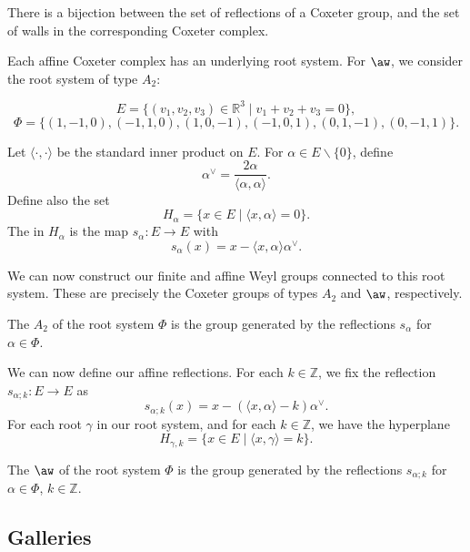 \documentclass[11pt]{article}
\begin{document}
\begin{proposition}\textnormal{\cite[Proposition 2.6]{RON}}
    There is a bijection between the set of reflections of a Coxeter group, and the set of walls in the corresponding Coxeter complex.
\end{proposition}

Each affine Coxeter complex has an underlying root system. For $\aw$, we consider the root system of type $A_2$:

\[E=\{(v_1,v_2,v_3)\in\mathbb{R}^3\mid v_1+v_2+v_3=0\},\]
\[\Phi = \{(1,-1,0),(-1,1,0),(1,0,-1),(-1,0,1),(0,1,-1),(0,-1,1)\}.\]


\begin{definition}
    Let $\langle\cdot,\cdot\rangle$ be the standard inner product on $E$. 
    For $\alpha\in E\backslash\{0\}$, define
    \[\alpha^\vee=\dfrac{2\alpha}{\langle\alpha,\alpha\rangle}.\]
    Define also the set
    \[H_\alpha = \{x\in E\mid \langle x,\alpha\rangle=0\}.\]
    The  in $H_\alpha$ is the map $s_\alpha :E\to E$ with
    \[s_\alpha(x)=x-\langle x,\alpha\rangle\alpha^\vee.\]
\end{definition}



We can now construct our finite and affine Weyl groups connected to this root system. These are precisely the Coxeter groups of types $A_2$ and $\aw$, respectively.
\begin{definition}
    The  $A_2$ of the root system $\Phi$ is the group generated by the reflections $s_\alpha$ for $\alpha\in \Phi$. 
\end{definition}



We can now define our affine reflections. For each $k\in\mathbb{Z}$, we fix the reflection $s_{\alpha;k}:E\to E$ as
\[s_{\alpha;k}(x)=x-(\langle x,\alpha\rangle-k)\alpha^\vee.\]
For each root $\gamma$ in our root system, and for each $k\in\mathbb{Z}$, we have the hyperplane
\[H_{\gamma,k}=\{x\in E\mid \langle x, \gamma\rangle = k\}.\]


\begin{definition}
    The  $\aw$ of the root system $\Phi$ is the group generated by the reflections $s_{\alpha;k}$ for $\alpha\in \Phi$, $k\in \mathbb{Z}$. 
\end{definition}


\subsection{Galleries}
\end{document}
